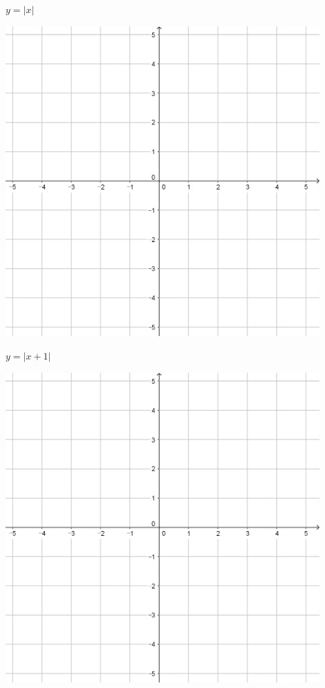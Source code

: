 \documentclass[a4paper]{oblivoir}
\begin{document}
\clearpage
\begin{minipage}{0.45\textwidth}\centering
\(y=|x|\)
\par\bigskip\includegraphics[width=0.9\textwidth]{55}
\end{minipage}
\begin{minipage}{0.45\textwidth}\centering
\(y=|x+1|\)
\par\bigskip\includegraphics[width=0.9\textwidth]{55}
\end{minipage}\bigskip\bigskip\par
\end{document}
